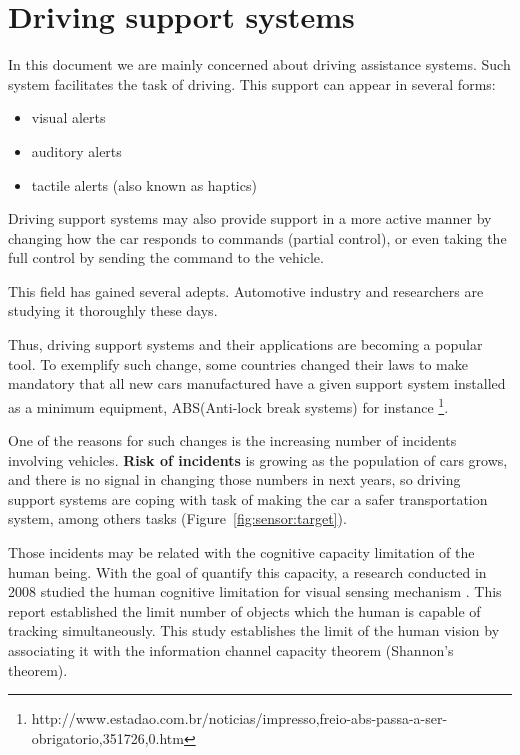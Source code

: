 \section{Driving support systems}

In this document we are mainly concerned about driving assistance systems. Such system facilitates the task of driving. This support can appear in several forms: 

\begin{itemize}
\item visual alerts
\item auditory alerts
\item tactile alerts (also known as haptics\cite{riener2010sensor})
\end{itemize}

Driving support systems may also provide support in a more active manner by changing how the car responds to commands (partial control), or even taking the full control by sending the command to the vehicle.

This field has gained several adepts. Automotive industry and researchers are studying it thoroughly these days.

Thus, driving support systems and their applications are becoming a popular tool. To exemplify such change, some countries changed their laws to make mandatory that all new cars manufactured have a given support system installed as a minimum equipment, ABS(Anti-lock break systems)  for instance \footnote{http://www.estadao.com.br/noticias/impresso,freio-abs-passa-a-ser-obrigatorio,351726,0.htm}.

One of the reasons for such changes is the increasing number of incidents involving vehicles. \textbf{Risk of incidents} is growing as the population of cars grows, and there is no signal in changing those numbers in next years, so driving support systems are coping with task of making the car a safer transportation system, among others tasks (Figure~\ref{fig:sensor:target}).

Those incidents may be related with the cognitive capacity limitation of the human being. With the goal of quantify this capacity, a research conducted in 2008 studied the human cognitive limitation for visual sensing mechanism \cite{LautarutisV}. This report established the limit number of objects which the human is capable of tracking simultaneously. This study establishes the limit of the human vision by associating it with the information channel capacity theorem (Shannon's theorem). 

